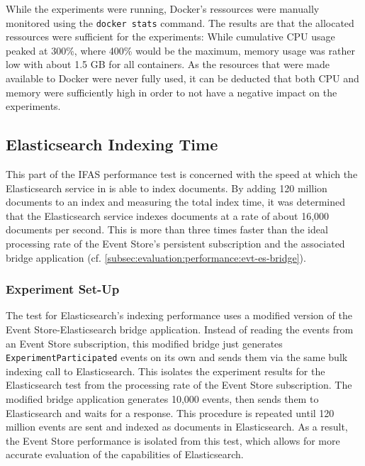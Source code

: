 
While the experiments were running, Docker's ressources were manually monitored using the \texttt{docker stats} command.
The results are that the allocated ressources were sufficient for the experiments:
While cumulative CPU usage peaked at 300\%, where 400\% would be the maximum, memory usage was rather low with about 1.5 GB for all containers.
As the resources that were made available to Docker were never fully used, it can be deducted that both CPU and memory were sufficiently high in order to not have a negative impact on the experiments.

\subsection{Elasticsearch Indexing Time}
\label{subsec:evaluation:performance:elasticsearch}

This part of the \ac{IFAS} performance test is concerned with the speed at which the Elasticsearch service in is able to index documents.
By adding 120 million documents to an index and measuring the total index time, it was determined that the Elasticsearch service indexes documents at a rate of about 16,000 documents per second.
This is more than three times faster than the ideal processing rate of the Event Store's persistent subscription and the associated bridge application (cf. \cref{subsec:evaluation:performance:evt-es-bridge}).

\subsubsection{Experiment Set-Up}

The test for Elasticsearch's indexing performance uses a modified version of the Event Store-Elasticsearch bridge application.
Instead of reading the events from an Event Store subscription, this modified bridge just generates \texttt{ExperimentParticipated} events on its own and sends them via the same bulk indexing call to Elasticsearch.
This isolates the experiment results for the Elasticsearch test from the processing rate of the Event Store subscription.
The modified bridge application generates 10,000 events, then sends them to Elasticsearch and waits for a response.
This procedure is repeated until 120 million events are sent and indexed as documents in Elasticsearch.
As a result, the Event Store performance is isolated from this test, which allows for more accurate evaluation of the capabilities of Elasticsearch.

